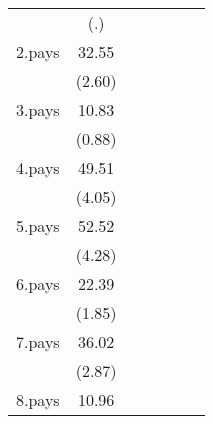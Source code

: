 {\begin{tabular}{l*{6}{c}}
                    &         (.)         &                     &                     &                     &                     &                     \\
[1em]
2.pays              &       32.55\sym{**} &                     &                     &                     &                     &                     \\
                    &      (2.60)         &                     &                     &                     &                     &                     \\
[1em]
3.pays              &       10.83         &                     &                     &                     &                     &                     \\
                    &      (0.88)         &                     &                     &                     &                     &                     \\
[1em]
4.pays              &       49.51\sym{***}&                     &                     &                     &                     &                     \\
                    &      (4.05)         &                     &                     &                     &                     &                     \\
[1em]
5.pays              &       52.52\sym{***}&                     &                     &                     &                     &                     \\
                    &      (4.28)         &                     &                     &                     &                     &                     \\
[1em]
6.pays              &       22.39         &                     &                     &                     &                     &                     \\
                    &      (1.85)         &                     &                     &                     &                     &                     \\
[1em]
7.pays              &       36.02\sym{**} &                     &                     &                     &                     &                     \\
                    &      (2.87)         &                     &                     &                     &                     &                     \\
[1em]
8.pays              &       10.96         &                     &                     &                     &                     &                     \\

\end{tabular}}
